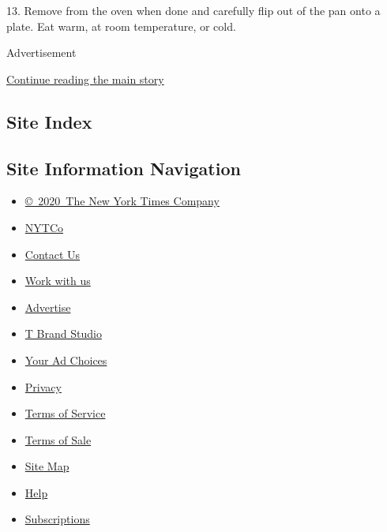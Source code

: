 13. Remove from the oven when done and carefully flip out of the pan
onto a plate. Eat warm, at room temperature, or cold.

Advertisement

\protect\hyperlink{after-bottom}{Continue reading the main story}

\hypertarget{site-index}{%
\subsection{Site Index}\label{site-index}}

\hypertarget{site-information-navigation}{%
\subsection{Site Information
Navigation}\label{site-information-navigation}}

\begin{itemize}
\tightlist
\item
  \href{https://help.nytimes3xbfgragh.onion/hc/en-us/articles/115014792127-Copyright-notice}{©~2020~The
  New York Times Company}
\end{itemize}

\begin{itemize}
\tightlist
\item
  \href{https://www.nytco.com/}{NYTCo}
\item
  \href{https://help.nytimes3xbfgragh.onion/hc/en-us/articles/115015385887-Contact-Us}{Contact
  Us}
\item
  \href{https://www.nytco.com/careers/}{Work with us}
\item
  \href{https://nytmediakit.com/}{Advertise}
\item
  \href{http://www.tbrandstudio.com/}{T Brand Studio}
\item
  \href{https://www.nytimes3xbfgragh.onion/privacy/cookie-policy\#how-do-i-manage-trackers}{Your
  Ad Choices}
\item
  \href{https://www.nytimes3xbfgragh.onion/privacy}{Privacy}
\item
  \href{https://help.nytimes3xbfgragh.onion/hc/en-us/articles/115014893428-Terms-of-service}{Terms
  of Service}
\item
  \href{https://help.nytimes3xbfgragh.onion/hc/en-us/articles/115014893968-Terms-of-sale}{Terms
  of Sale}
\item
  \href{https://spiderbites.nytimes3xbfgragh.onion}{Site Map}
\item
  \href{https://help.nytimes3xbfgragh.onion/hc/en-us}{Help}
\item
  \href{https://www.nytimes3xbfgragh.onion/subscription?campaignId=37WXW}{Subscriptions}
\end{itemize}

